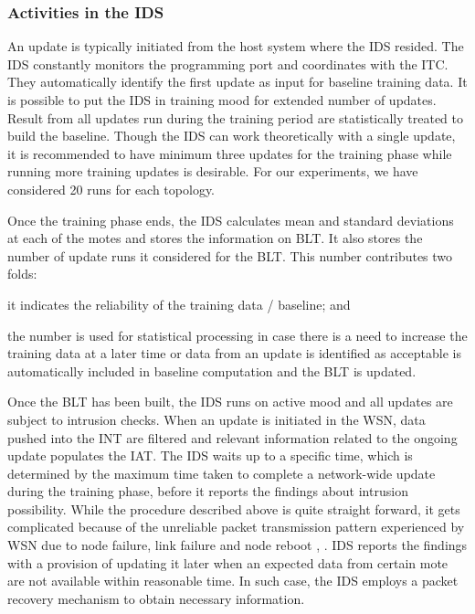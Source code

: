 \documentclass[conference,final]{IEEEtran}
\begin{document}
\subsubsection{Activities in the IDS}
\label{ssc:actids}
An update is typically initiated from the host system where the IDS resided.
The IDS constantly monitors the programming port and coordinates with the ITC. 
They automatically identify the first update as input for baseline training data.
It is possible to put the IDS in training mood for extended number of updates.
Result from all updates run during the training period are statistically treated to build the baseline.
Though the IDS can work theoretically with a single update, it is recommended to have minimum three updates for the training phase while running more training updates is desirable.
For our experiments, we have considered 20 runs for each topology.

Once the training phase ends, the IDS calculates mean and standard deviations at each of the motes and stores the  information on BLT.
It also stores the number of update runs it considered for the BLT.
This number contributes two folds:
\begin{inparaenum}
\item it indicates the reliability of the training data / baseline; and
\item the number is used for statistical processing in case there is a need to increase the training data at a later time or data from an update is identified as acceptable is automatically included in baseline computation and the BLT is updated.
\end{inparaenum}
Once the BLT has been built, the IDS runs on active mood and all updates are subject to intrusion checks.
When an update is initiated in the WSN, data pushed into the INT are filtered and relevant information related to the ongoing update populates the  IAT.
The IDS waits up to a specific time, which is determined by the maximum time taken to complete a network-wide  update during the training phase, before it reports the findings about intrusion possibility.
While the procedure described above is quite straight forward, it gets complicated because of the unreliable packet transmission pattern experienced by WSN due to node failure, link failure and node reboot \cite{aro04}, \cite{bec04}.
IDS reports the findings with a provision of updating it later when an expected data from certain mote are not available within reasonable time.
In such case, the IDS employs a packet recovery mechanism to obtain necessary information.
\end{document}
